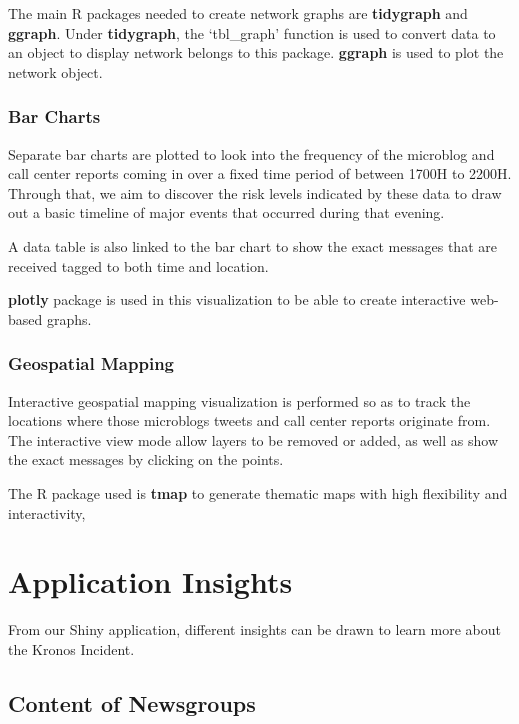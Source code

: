 \documentclass{acm_proc_article-sp}
\begin{document}
The main R packages needed to create network graphs are
\textbf{tidygraph} and \textbf{ggraph}. Under \textbf{tidygraph}, the
`tbl\_graph' function is used to convert data to an object to display
network belongs to this package. \textbf{ggraph} is used to plot the
network object.

\hypertarget{bar-charts}{%
\subsubsection{Bar Charts}\label{bar-charts}}

Separate bar charts are plotted to look into the frequency of the
microblog and call center reports coming in over a fixed time period of
between 1700H to 2200H. Through that, we aim to discover the risk levels
indicated by these data to draw out a basic timeline of major events
that occurred during that evening.

A data table is also linked to the bar chart to show the exact messages
that are received tagged to both time and location.

\textbf{plotly} package is used in this visualization to be able to
create interactive web-based graphs.

\hypertarget{geospatial-mapping}{%
\subsubsection{Geospatial Mapping}\label{geospatial-mapping}}

Interactive geospatial mapping visualization is performed so as to track
the locations where those microblogs tweets and call center reports
originate from. The interactive view mode allow layers to be removed or
added, as well as show the exact messages by clicking on the points.

The R package used is \textbf{tmap} to generate thematic maps with high
flexibility and interactivity,

\hypertarget{application-insights}{%
\section{Application Insights}\label{application-insights}}

From our Shiny application, different insights can be drawn to learn
more about the Kronos Incident.

\hypertarget{content-of-newsgroups}{%
\subsection{Content of Newsgroups}\label{content-of-newsgroups}}
\end{document}

